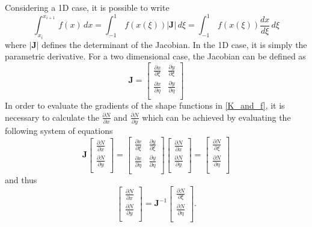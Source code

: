 \documentclass[../main.tex]{subfiles}
\begin{document}
%
Considering a 1D case, it is possible to write 
\begin{equation} \label{iso_definition}
    \int^{x_{i+1}}_{x_{i}} \, f(x)\,dx = \int^{1}_{-1} \, f(x(\xi))|\boldsymbol{J}|\, d\xi =
    \int^{1}_{-1}\, f(x(\xi)) \frac{dx}{d\xi}\,d\xi
\end{equation}
where $|\boldsymbol{J}|$ defines the determinant of the Jacobian. In the 1D case, it is simply the parametric derivative. 
For a two dimensional case, the Jacobian can be defined as
\begin{equation} \label{jacobian_determinant}
    \boldsymbol{J} = \begin{bmatrix}
        \frac{\partial x}{\partial \xi} & \frac{\partial y}{\partial \xi}\\
        \frac{\partial x}{\partial \eta} & \frac{\partial y}{\partial \eta}\\
    \end{bmatrix}
\end{equation}
In order to evaluate the gradients of the shape functions in \eqref{K_and_f}, it is necessary to calculate the $\frac{\partial N}{\partial x}$ and $\frac{\partial N}{\partial y}$ 
 which can be achieved by evaluating the following system of equations
 \begin{equation}
    \boldsymbol{J} \begin{bmatrix}
        \frac{\partial N}{\partial x}\\
        \frac{\partial N}{\partial y}\\
    \end{bmatrix} 
    =
    \begin{bmatrix}
        \frac{\partial x}{\partial \xi} & \frac{\partial y}{\partial \xi}\\
        \frac{\partial x}{\partial \eta} & \frac{\partial y}{\partial \eta}\\
    \end{bmatrix}
    \begin{bmatrix}
        \frac{\partial N}{\partial x}\\
        \frac{\partial N}{\partial y}\\
    \end{bmatrix}
    =
    \begin{bmatrix}
        \frac{\partial N}{\partial \xi}\\
        \frac{\partial N}{\partial \eta}\\
    \end{bmatrix}
\end{equation}
and thus
\begin{equation}
    \begin{bmatrix}
        \frac{\partial N}{\partial x}\\
        \frac{\partial N}{\partial y}\\
    \end{bmatrix}
    = \boldsymbol{J}^{-1}
    \begin{bmatrix}
        \frac{\partial N}{\partial \xi}\\
        \frac{\partial N}{\partial \eta}\\
    \end{bmatrix}.
\end{equation}
\end{document}
